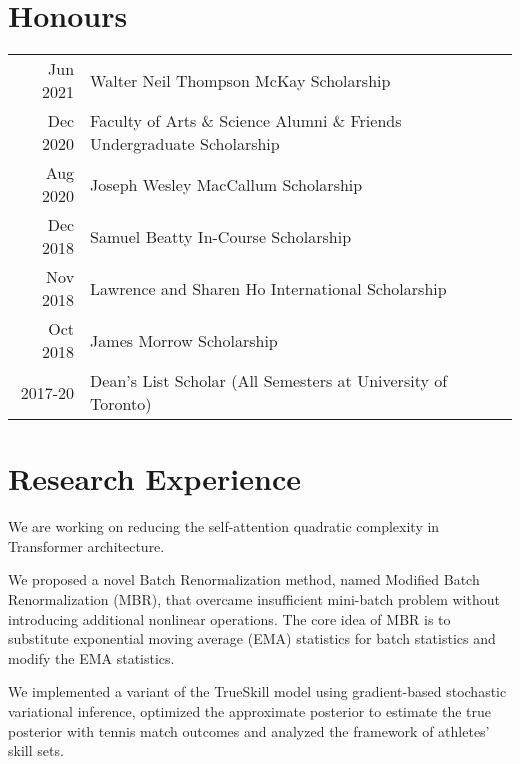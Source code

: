 \documentclass[letterpaper]{deedy-resume} %
\begin{document}
\begin{minipage}[t]{0.66\textwidth}
\section{Honours} 

\begin{tabular}{rll}
Jun 2021	 & Walter Neil Thompson McKay Scholarship \\
Dec 2020	 & Faculty of Arts \& Science Alumni \& Friends Undergraduate Scholarship \\
Aug 2020	 & Joseph Wesley MacCallum Scholarship \\
Dec 2018	 & Samuel Beatty In-Course Scholarship \\
Nov 2018	 & Lawrence and Sharen Ho International Scholarship\\
Oct 2018	 & James Morrow Scholarship \\
2017-20		 & Dean's List Scholar (All Semesters at University of Toronto)
\end{tabular}

\sectionspace %



\section{Research Experience}
\small{We are working on reducing the self-attention quadratic complexity in Transformer architecture.}

\sectionspace

\small{We proposed a novel Batch Renormalization method, named Modified Batch Renormalization (MBR), that overcame insufficient mini-batch problem without introducing additional nonlinear operations. The core idea of MBR is to substitute exponential moving average (EMA) statistics for batch statistics and modify the EMA statistics.}

\sectionspace

\small{We implemented a variant of the TrueSkill model using gradient-based stochastic variational inference, optimized the approximate posterior to estimate the true posterior with tennis match outcomes and analyzed the framework of athletes' skill sets.}


\end{minipage}
\end{document}
